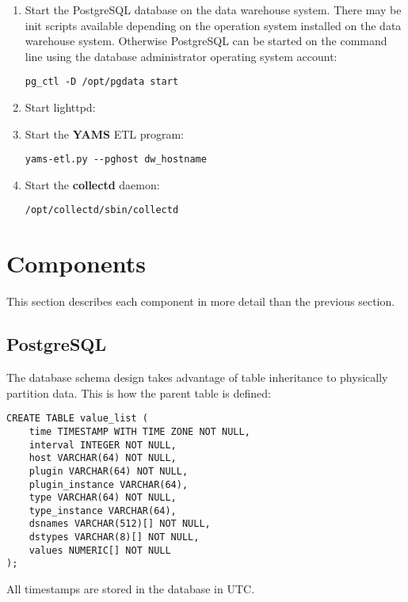 \documentclass[a4paper,twoside,12pt]{article}
\begin{document}
\begin{enumerate}
  \item Start the PostgreSQL database on the data warehouse system.  There may
        be init scripts available depending on the operation system installed
        on the data warehouse system.  Otherwise PostgreSQL can be started on
        the command line using the database administrator operating system
        account:
        \lstset{language=sh}
        \begin{lstlisting}
pg_ctl -D /opt/pgdata start
        \end{lstlisting}
  \item Start lighttpd:
  \item Start the \textbf{YAMS} ETL program:
        \lstset{language=sh}
        \begin{lstlisting}
yams-etl.py --pghost dw_hostname
        \end{lstlisting}
  \item Start the \textbf{collectd} daemon:
        \lstset{language=sh}
        \begin{lstlisting}
/opt/collectd/sbin/collectd
        \end{lstlisting}
\end{enumerate}

\section{Components}

This section describes each component in more detail than the previous section.

\subsection{PostgreSQL}

The database schema design takes advantage of table inheritance to physically
partition data.  This is how the parent table is defined:
\lstset{language=sql}
\begin{lstlisting}
CREATE TABLE value_list (
    time TIMESTAMP WITH TIME ZONE NOT NULL,
    interval INTEGER NOT NULL,
    host VARCHAR(64) NOT NULL,
    plugin VARCHAR(64) NOT NULL,
    plugin_instance VARCHAR(64),
    type VARCHAR(64) NOT NULL,
    type_instance VARCHAR(64),
    dsnames VARCHAR(512)[] NOT NULL,
    dstypes VARCHAR(8)[] NOT NULL,
    values NUMERIC[] NOT NULL
);
\end{lstlisting}

All timestamps are stored in the database in UTC.
\end{document}
